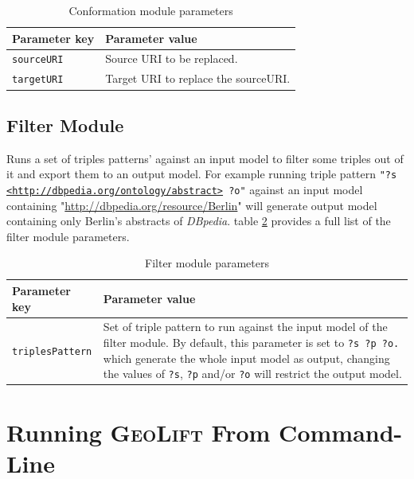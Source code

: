 \documentclass[a4paper,twoside,bibtotoc,abstracton,12pt,BCOR=15mm]{article}
\newcommand{\geolift}{\textsc{GeoLift}\xspace}
\begin{document}
\begin{table}
\caption{Conformation module parameters} \label{tbl:conformPram}
\small
\begin{tabularx}{\textwidth}{@{}lX@{}}
\toprule
\textbf{Parameter key} 	& \textbf{Parameter value} \\
\toprule
\texttt{sourceURI}	& Source URI to be replaced.\\
\midrule
\texttt{targetURI}	& Target URI to replace the sourceURI.\\
\bottomrule
\end{tabularx}
\end{table}

\subsection{Filter Module}
Runs a set of triples patterns' against an input model to filter some triples out of it and export them to an output model. 
For example running triple pattern \texttt{"?s \url{<http://dbpedia.org/ontology/abstract>} ?o"} against an input model containing "\url{http://dbpedia.org/resource/Berlin}" will generate output model containing only Berlin's abstracts of \emph{DBpedia}.
table \ref{tbl:filterPram} provides a full list of the filter module parameters.

\begin{table}
\caption{Filter module parameters} \label{tbl:filterPram}
\small
\begin{tabularx}{\textwidth}{@{}lX@{}}
\toprule
\textbf{Parameter key} 	& \textbf{Parameter value} \\
\toprule
\texttt{triplesPattern}	& Set of triple pattern to run against the input model of the filter module. By default, this parameter is set to \texttt{?s ?p ?o.} which generate the whole input model as output, changing the values of \texttt{?s}, \texttt{?p} and/or \texttt{?o} will restrict the output model.\\
\bottomrule
\end{tabularx}
\end{table}

\section{Running \geolift From Command-Line }
\end{document}
